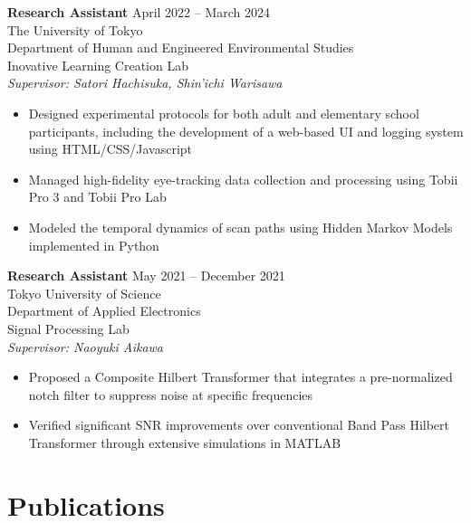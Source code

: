 \documentclass[letterpaper,10.5pt]{article}
\begin{document}
\vspace{30pt}
\textbf{Research Assistant} \hfill April 2022 -- March 2024 \\ 
The University of Tokyo \\ 
Department of Human and Engineered Environmental Studies \\ 
{\small {Inovative Learning Creation Lab}} \\ 
{\small \textit{Supervisor: Satori Hachisuka, Shin'ichi Warisawa}} \\ 
\vspace{-5pt}
\begin{itemize}[itemsep=0pt, parsep=0pt, topsep=0pt]
  \item Designed experimental protocols for both adult and elementary school participants, including the development of a web-based UI and logging system using HTML/CSS/Javascript
  \item Managed high-fidelity eye-tracking data collection and processing using Tobii Pro 3 and Tobii Pro Lab
  \item Modeled the temporal dynamics of scan paths using Hidden Markov Models implemented in Python
\end{itemize}
\vspace{30pt}
\textbf{Research Assistant} \hfill May 2021 -- December 2021 \\ 
Tokyo University of Science \\ 
Department of Applied Electronics \\ 
{\small {Signal Processing Lab}} \\ 
{\small \textit{Supervisor: Naoyuki Aikawa}} \\ 
\vspace{-5pt}
\begin{itemize}[itemsep=0pt, parsep=0pt, topsep=0pt]
  \item Proposed a Composite Hilbert Transformer that integrates a pre-normalized notch filter to suppress noise at specific frequencies
  \item Verified significant SNR improvements over conventional Band Pass Hilbert Transformer through extensive simulations in MATLAB
\end{itemize}
\vspace{30pt}
\section*{Publications}
\end{document}
